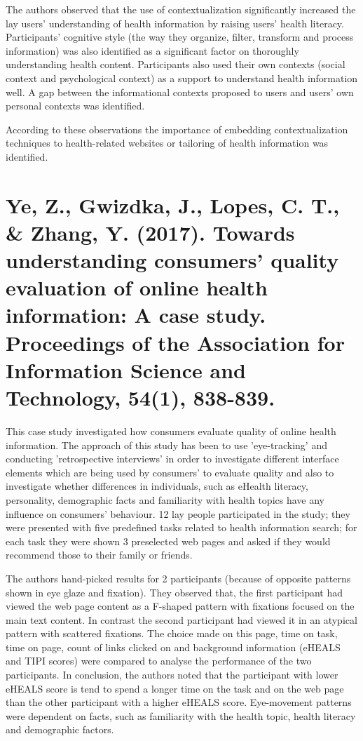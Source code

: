 \documentclass[]{article}
\begin{document}
The authors observed that the use of contextualization significantly increased the lay users' understanding of health information by raising users' health literacy. Participants' cognitive style (the way they organize, filter, transform and process information) was also identified as a significant factor on thoroughly understanding health content. Participants also used their own contexts (social context and psychological context) as a support to understand health information well. A gap between the informational contexts proposed to users and users' own personal contexts was identified.  

According to these observations the importance of embedding contextualization techniques to health-related websites or tailoring of health information was identified. 

\section{Ye, Z., Gwizdka, J., Lopes, C. T., \& Zhang, Y. (2017). Towards understanding consumers' quality evaluation of online health information: A case study. Proceedings of the Association for Information Science and Technology, 54(1), 838-839.}

This case study investigated how consumers evaluate quality of online health information. The approach of this study has been to use 'eye-tracking' and conducting 'retrospective interviews' in order to investigate different interface elements which are being used by consumers' to evaluate quality and also to investigate whether differences in individuals, such as eHealth literacy, personality, demographic facts and familiarity with health topics have any influence on consumers' behaviour. 12 lay people participated in the study; they were presented with five predefined tasks related to health information search; for each task they were shown 3 preselected web pages and asked if they would recommend those to their family or friends. 

The authors hand-picked results for 2 participants (because of opposite patterns shown in eye glaze and fixation). They observed that, the first participant had viewed the web page content as a F-shaped pattern with fixations focused on the main text content. In contrast the second participant had viewed it in an atypical pattern with scattered fixations. The choice made on this page, time on task, time on page, count of links clicked on and background information (eHEALS and TIPI scores) were compared to analyse the performance of the two participants. In conclusion, the authors noted that the participant with lower eHEALS score is tend to spend a longer time on the task and on the web page than the other participant with a higher eHEALS score. Eye-movement patterns were dependent on facts, such as familiarity with the health topic, health literacy and demographic factors.               
\end{document}
